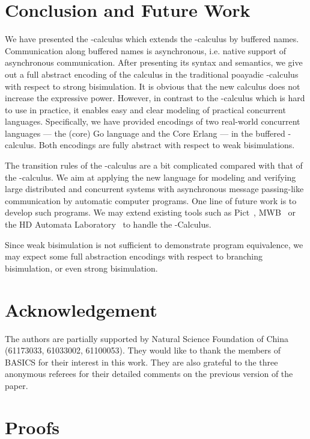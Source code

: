\documentclass[runningheads, envcountsame, a4paper]{llncs}
\begin{document}
\section{Conclusion and Future Work}
\label{sec:con}

We have presented the -calculus which extends the -calculus by buffered names.
Communication along buffered names is asynchronous, i.e. native support of asynchronous communication.
After presenting its syntax and semantics, we give out a full abstract encoding of the  calculus in the traditional poayadic -calculus
with respect to strong bisimulation.
It is obvious that the new calculus does not increase the expressive power.
However, in contrast to the -calculus which is hard to use in practice, it enables easy and clear modeling of practical concurrent languages.
Specifically, we have provided encodings of two real-world concurrent languages --- the (core) Go language and the Core Erlang --- in the buffered -calculus.
Both encodings are fully abstract with respect to weak bisimulations.

The transition rules of the -calculus are a bit complicated compared with that of the -calculus.
We aim at applying the new language for modeling and verifying large distributed and concurrent systems
with asynchronous message passing-like communication by automatic computer programs.
One line of future work is to develop such programs.
We may extend existing tools such as Pict~\cite{Pierce2000}, MWB~\cite{Victor1994} or the HD Automata Laboratory~\cite{Ferrari2003}
to handle the -Calculus.

Since weak bisimulation is not sufficient to demonstrate program equivalence, we may expect some full abstraction encodings
with respect to branching bisimulation, or even strong bisimulation.


\section*{Acknowledgement}
The authors are partially supported by Natural Science Foundation of China (61173033, 61033002, 61100053).
They would like to thank the members of BASICS for their interest in this work.
They are also grateful to the three anonymous referees for their detailed comments on the previous version of the paper.






\newpage

\appendix
\section{Proofs}
\end{document}
